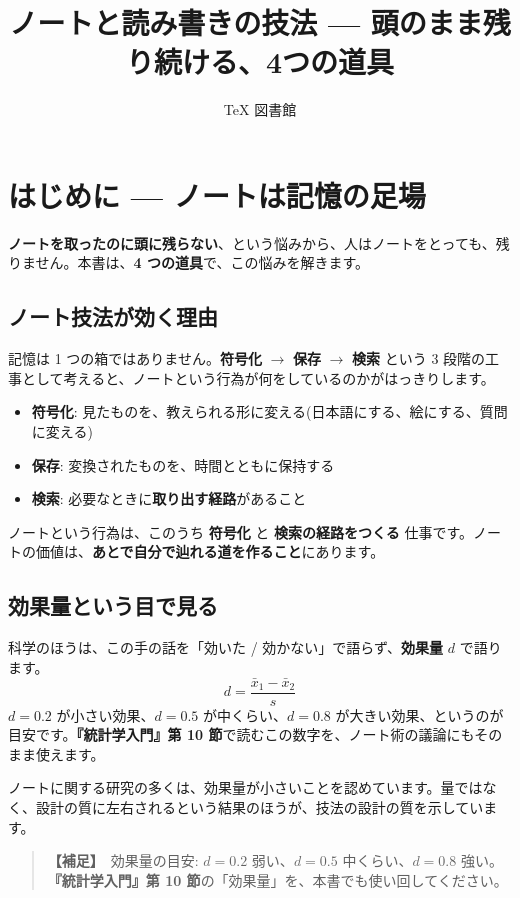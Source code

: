 \documentclass{article}
\title{ノートと読み書きの技法 — 頭のまま残り続ける、4つの道具}
\author{TeX 図書館}
\begin{document}
\section{はじめに — ノートは記憶の足場}

\textbf{ノートを取ったのに頭に残らない}、という悩みから、人はノートをとっても、残りません。本書は、\textbf{4 つの道具}で、この悩みを解きます。

\subsection{ノート技法が効く理由}

記憶は 1 つの箱ではありません。\textbf{符号化} \(\rightarrow\) \textbf{保存} \(\rightarrow\) \textbf{検索} という 3 段階の工事として考えると、ノートという行為が何をしているのかがはっきりします。

\begin{itemize}
\item \textbf{符号化}: 見たものを、教えられる形に変える(日本語にする、絵にする、質問に変える)
\item \textbf{保存}: 変換されたものを、時間とともに保持する
\item \textbf{検索}: 必要なときに\textbf{取り出す経路}があること
\end{itemize}

ノートという行為は、このうち \textbf{符号化} と \textbf{検索の経路をつくる} 仕事です。ノートの価値は、\textbf{あとで自分で辿れる道を作ること}にあります。

\subsection{効果量という目で見る}

科学のほうは、この手の話を「効いた / 効かない」で語らず、\textbf{効果量} \(d\) で語ります。
\[ d = \frac{\bar{x}_1 - \bar{x}_2}{s} \]
\(d = 0.2\) が小さい効果、\(d = 0.5\) が中くらい、\(d = 0.8\) が大きい効果、というのが目安です。\textbf{『統計学入門』第 10 節}で読むこの数字を、ノート術の議論にもそのまま使えます。

ノートに関する研究の多くは、効果量が小さいことを認めています。量ではなく、設計の質に左右されるという結果のほうが、技法の設計の質を示しています。

\begin{quote}
\textbf{【補足】}\ 効果量の目安: \(d = 0.2\) 弱い、\(d = 0.5\) 中くらい、\(d = 0.8\) 強い。\textbf{『統計学入門』第 10 節}の「効果量」を、本書でも使い回してください。
\end{quote}
\end{document}
